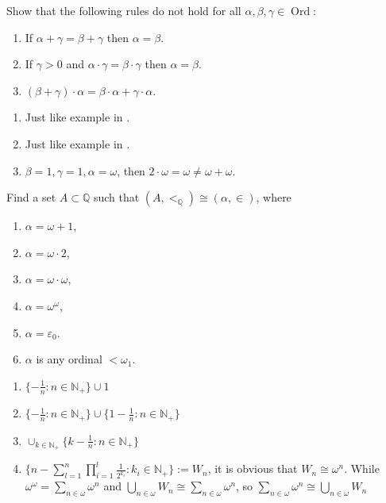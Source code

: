 \documentclass{ctexart}
\DeclareMathOperator{\ord}{Ord}
\begin{document}
\begin{problem}
Show that the following rules do not hold for all $\alpha, \beta, \gamma \in\ord$:
\begin{enumerate}[label=\alph*,ref=\theproblem.\alph*]
\item If $\alpha+\gamma=\beta+\gamma$ then $\alpha=\beta$.
\item If $\gamma>0$ and $\alpha \cdot \gamma=\beta \cdot \gamma$ then $\alpha=\beta$.
\item $(\beta+\gamma) \cdot \alpha=\beta \cdot \alpha+\gamma \cdot \alpha$.
\end{enumerate}
\end{problem}
\begin{solution}
    \begin{enumerate}
        \item Just like example in .
        \item Just like example in .
        \item $\beta=1,\gamma=1,\alpha=\omega$, then $2\cdot \omega=\omega\neq \omega+\omega$.
    \end{enumerate}
\end{solution}



\begin{problem}
Find a set $A \subset \mathbb{Q}$ such that $\left(A,<_{\mathbb{Q}}\right) \cong(\alpha, \in)$, where
\begin{enumerate}[label=\alph*,ref=\theproblem.\alph*]
\item  $\alpha=\omega+1$,
\item  $\alpha=\omega \cdot 2$,
\item  $\alpha=\omega \cdot \omega$,
\item  $\alpha=\omega^\omega$,
\item  $\alpha=\varepsilon_0$.
\item  $\alpha$ is any ordinal $<\omega_1$.
\end{enumerate}
\end{problem}
\begin{solution}
    \begin{enumerate}
        \item $\{-\frac{1}{n}:n\in \mathbb{N}_+\}\cup {1}$
        \item $\{-\frac{1}{n}:n\in \mathbb{N}_+\}\cup\{1-\frac{1}{n}:n\in \mathbb{N}_+\}$
        \item $\cup_{k\in \mathbb{N}_+}\{k-\frac{1}{n}:n\in \mathbb{N}_+\}$
        \item $\{n-\sum_{l=1}^{n}\prod_{i=1}^{l}\frac{1}{2^{k_i}}:k_i\in \mathbb{N}_+\}:=W_n$, it is obvious that $W_n\cong \omega^{n}$. While  $\omega^ \omega=\sum_{n\in \omega} \omega^n$ and $\bigcup_{n\in \omega}W_n\cong \sum_{n\in \omega}\omega^n$, so $\sum_{n\in \omega}\omega^n\cong\bigcup_{n\in \omega}W_n$
    \end{enumerate}
\end{solution}
\end{document}
